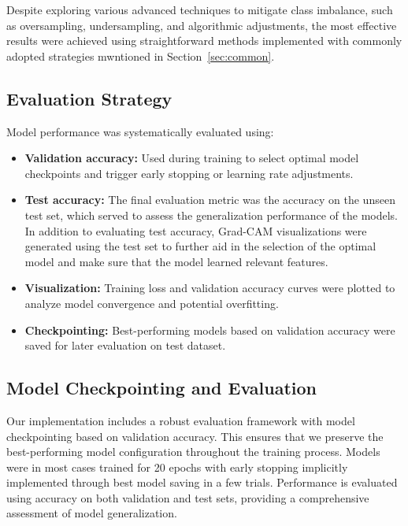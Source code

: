\documentclass[a4paper,12pt]{report}
\begin{document}
Despite exploring various advanced techniques to mitigate class imbalance, such as oversampling, undersampling, and algorithmic adjustments, the most effective results were achieved using straightforward methods implemented with commonly adopted strategies mwntioned in Section~\ref{sec:common}.




\subsection{Evaluation Strategy}

Model performance was systematically evaluated using:

\begin{itemize}
    \item \textbf{Validation accuracy:} Used during training to select optimal model checkpoints and trigger early stopping or learning rate adjustments.
    \item \textbf{Test accuracy:} The final evaluation metric was the accuracy on the unseen test set, which served to assess the generalization performance of the models. In addition to evaluating test accuracy, Grad-CAM visualizations were generated using the test set to further aid in the selection of the optimal model and make sure that the model learned relevant features.
    \item \textbf{Visualization:} Training loss and validation accuracy curves were plotted to analyze model convergence and potential overfitting.
    \item \textbf{Checkpointing:} Best-performing models based on validation accuracy were saved for later evaluation on test dataset.
\end{itemize}

\subsection{Model Checkpointing and Evaluation}

Our implementation includes a robust evaluation framework with model checkpointing based on validation accuracy. This ensures that we preserve the best-performing model configuration throughout the training process. Models were in most cases trained for 20 epochs with early stopping implicitly implemented through best model saving in a few trials. Performance is evaluated using accuracy on both validation and test sets, providing a comprehensive assessment of model generalization.
\end{document}
